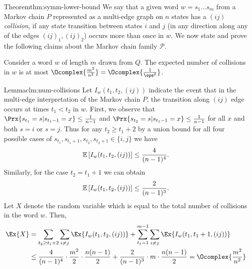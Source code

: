 \begin{prevproof}{Theorem}{thm:symm-lower-bound}
We say that a given word $w=s_1\ldots s_m$ from a Markov chain $P$ represented as a multi-edge graph on $n$ states has a $(ij)$ {\em collision}, 
if any state transition between states $i$ and $j$ (in any direction along any of the edges $(ij)_1,(ij)_2$) occurs more than once in $w$. We now 
state and prove the following claims about the Markov chain family $\mathcal{P}$.


\begin{lemma}
	\label{clm:num-collisions}
	Consider a word $w$ of length $m$ drawn from $Q$. The expected number of collisions in $w$ is
	at most $\Ocomplex{\frac{m^2}{n^2}}=\Ocomplex{\frac{1}{\eps^2}}$. 
\end{lemma}
\begin{prevproof}{Lemma}{clm:num-collisions}
	Let $I_w(t_1,t_2,(ij))$ indicate the event that in the multi-edge interpretation of the Markov chain $P$, the transition along $(ij)$ edge occurs at times $t_1<t_2$  in $w$. 
	First, we observe that $\Prx{s_{t_1}=s | s_{t_1-1}=x} \leq \frac{1}{n-1}$ and $\Prx{s_{t_2}=s | s_{t_1-1}=x} \leq \frac{1}{n-1}$ for all $x$ and both $s=i$ or $s=j$.
	Thus for any $t_2\ge t_1+2$ by a union bound for all four possible cases of $s_{t_1},s_{t_1+1},s_{t_2},s_{t_2+1}\in\{i,j\}$ we have 
	$$\mathbb{E}\left[I_w(t_1,t_2,(ij)) \right] \leq \frac{4}{(n-1)^4}.$$
	Similarly, for the case $t_2=t_1+1$ we can obtain 
	$$\mathbb{E}\left[I_w(t_1,t_2,(ij)) \right] \leq \frac{2}{(n-1)^3}.$$
	Let $X$ denote the random variable which is equal to the total number of collisions in the word $w$. Then,
	\begin{align*}
	\Ex{X} &= \sum_{t_2 \ge t_1+2}\sum_{i\neq j} \Ex{I_w(t_1,t_2,(ij))} + \sum_{t_1=1}^{m-1}\sum_{i\neq j} \Ex{I_w(t_1,t_1+1,(ij))}\\
	& \le \frac{4}{(n-1)^4}\cdot\frac{m^2}{2}\cdot\frac{n(n-1)}{2}+ \frac{2}{(n-1)^3}\cdot m\cdot\frac{n(n-1)}{2}
	=\Ocomplex{\frac{m^2}{n^2}}

\end{align*}
\end{prevproof}
\end{prevproof}
